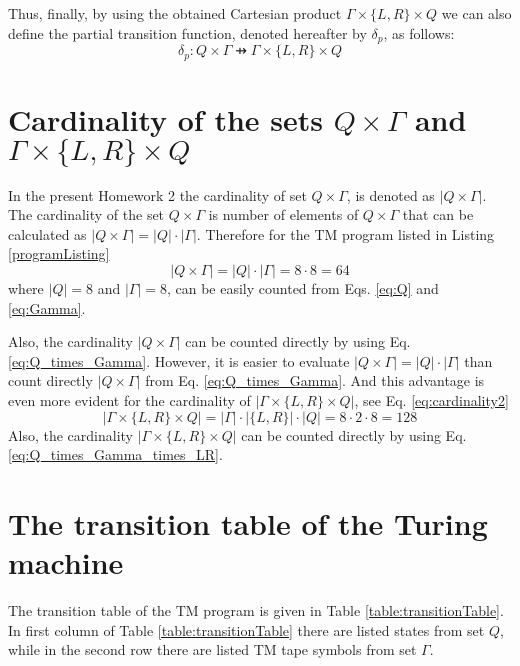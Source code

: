 \documentclass[12pt, a4paper, bibliography=totocnumbered]{report}
\begin{document}
{{		Thus, finally, by using the obtained Cartesian product $ \Gamma \times \{L,R\} \times Q $ we can also define the partial transition function, denoted hereafter by $ \delta_p $, as follows:
		\begin{equation}\label{key}
			\delta_p : Q \times \Gamma \pfun \Gamma \times \{L,R\} \times Q
		\end{equation}
		}
		
	\section{Cardinality of the sets $ Q \times \Gamma$ and $ \Gamma \times \{L, R\} \times Q $}
	In the present Homework 2 the cardinality of set $ Q \times \Gamma $, is denoted as $ |Q \times \Gamma| $. The cardinality of the set $ Q \times \Gamma $ is number of elements of $ Q \times \Gamma $ that can be calculated as $ |Q \times \Gamma| = |Q| \cdot |\Gamma| $. Therefore for the TM program listed in Listing \ref{programListing} 
	\begin{equation}\label{eq:cardinality2}
		|Q \times \Gamma| = |Q| \cdot |\Gamma| = 8 \cdot 8 = 64
	\end{equation}
	where $ |Q| = 8 $ and $ |\Gamma| = 8 $, can be easily counted from Eqs. \eqref{eq:Q} and \eqref{eq:Gamma}.
	
	Also, the cardinality $ |Q \times \Gamma| $ can be counted directly by using Eq. \eqref{eq:Q_times_Gamma}. However, it is easier to evaluate $ {|Q \times \Gamma| = {|Q|}\cdot|\Gamma|}$ than count directly $ |Q \times \Gamma| $ from Eq. \eqref{eq:Q_times_Gamma}. And this  advantage is even more evident for the cardinality of $ |\Gamma \times \{L, R\} \times Q| $, see Eq. \eqref{eq:cardinality2}
	\begin{equation}\label{eq:cardinality2}
		|\Gamma \times \{L, R\} \times Q| = |\Gamma| \cdot |\{L, R\}| \cdot |Q| = 8 \cdot 2 \cdot 8 = 128
	\end{equation}
	Also, the cardinality $ |\Gamma \times \{L, R\} \times Q| $ can be counted directly by using Eq. \eqref{eq:Q_times_Gamma_times_LR}. 
	
	\newpage
	\section{The transition table of the Turing machine}
	The transition table of the TM program is given in Table \ref{table:transitionTable}. In first column of Table \ref{table:transitionTable} there are listed states from set $ Q $, while in the second row there are listed TM tape symbols from set $ \Gamma $.


}
\end{document}
